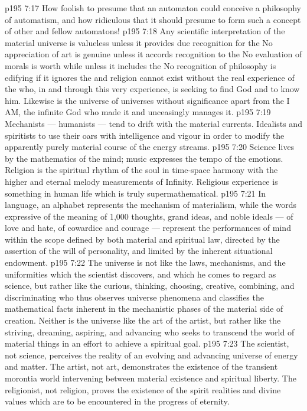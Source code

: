 \vs p195 7:17 \pc How foolish to presume that an automaton could conceive a philosophy of automatism, and how ridiculous that it should presume to form such a concept of other and fellow automatons!
\vs p195 7:18 \pc Any scientific interpretation of the material universe is valueless unless it provides due recognition for the  No appreciation of art is genuine unless it accords recognition to the  No evaluation of morals is worth while unless it includes the  No recognition of philosophy is edifying if it ignores the  and religion cannot exist without the real experience of the  who, in and through this very experience, is seeking to find God and to know him. Likewise is the universe of universes without significance apart from the I AM, the infinite God who made it and unceasingly manages it.
\vs p195 7:19 \pc Mechanists --- humanists --- tend to drift with the material currents. Idealists and spiritists  to use their oars with intelligence and vigour in order to modify the apparently purely material course of the energy streams.
\vs p195 7:20 \pc Science lives by the mathematics of the mind; music expresses the tempo of the emotions. Religion is the spiritual rhythm of the soul in time\hyp{}space harmony with the higher and eternal melody measurements of Infinity. Religious experience is something in human life which is truly supermathematical.
\vs p195 7:21 In language, an alphabet represents the mechanism of materialism, while the words expressive of the meaning of 1,000 thoughts, grand ideas, and noble ideals --- of love and hate, of cowardice and courage --- represent the performances of mind within the scope defined by both material and spiritual law, directed by the assertion of the will of personality, and limited by the inherent situational endowment.
\vs p195 7:22 The universe is not like the laws, mechanisms, and the uniformities which the scientist discovers, and which he comes to regard as science, but rather like the curious, thinking, choosing, creative, combining, and discriminating  who thus observes universe phenomena and classifies the mathematical facts inherent in the mechanistic phases of the material side of creation. Neither is the universe like the art of the artist, but rather like the striving, dreaming, aspiring, and advancing  who seeks to transcend the world of material things in an effort to achieve a spiritual goal.
\vs p195 7:23 The scientist, not science, perceives the reality of an evolving and advancing universe of energy and matter. The artist, not art, demonstrates the existence of the transient morontia world intervening between material existence and spiritual liberty. The religionist, not religion, proves the existence of the spirit realities and divine values which are to be encountered in the progress of eternity.
